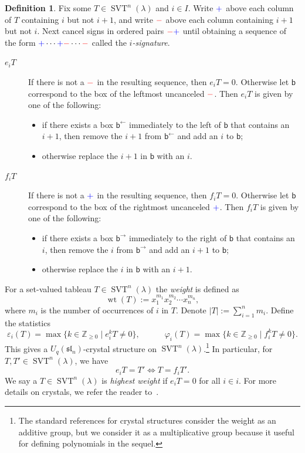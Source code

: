 \documentclass[10pt]{amsart}
\theoremstyle{definition}
\newtheorem{defi}[theo]{Definition}
\newcommand{\bbb}{\mathsf{b}}
\newcommand{\abs}[1]{\lvert #1 \rvert}
\newcommand{\fsl}{\mathfrak{sl}}
\DeclareMathOperator{\wt}{wt} %
\DeclareMathOperator{\svt}{SVT} %
\newcommand{\ZZ}{\mathbb{Z}}
\newcommand{\bplus}{{\color{blue}+}}
\newcommand{\bminus}{{\color{red}-}}
\newcommand{\defn}[1]{{\color{darkred}\emph{#1}}} %
\begin{document}
\begin{defi}
\label{defn:svt_crystal_ops}
Fix some $T \in \svt^n(\lambda)$ and $i \in I$.
Write $\bplus$ above each column of $T$ containing $i$ but not $i+1$, and write $\bminus$ above each column containing $i+1$ but not $i$. Next cancel signs in ordered pairs $\bminus \bplus$ until obtaining a sequence of the form $\bplus \cdots \bplus \bminus \cdots \bminus$ called the \defn{$i$-signature}.
\begin{description}
\item[\defn{$e_i T$}] If there is not a $\bminus$ in the resulting sequence, then $e_i T = 0$. Otherwise let $\bbb$ correspond to the box of the leftmost uncanceled $\bminus$. Then $e_i T$ is given by one of the following:
\begin{itemize}
\item if there exists a box $\bbb^{\leftarrow}$ immediately to the left of $\bbb$ that contains an $i+1$, then remove the $i+1$ from $\bbb^{\leftarrow}$ and add an $i$ to $\bbb$;
\item otherwise replace the $i+1$ in $\bbb$ with an $i$.
\end{itemize}

\item[\defn{$f_i T$}] If there is not a $\bplus$ in the resulting sequence, then $f_i T = 0$. Otherwise let $\bbb$ correspond to the box of the rightmost uncanceled $\bplus$. Then $f_i T$ is given by one of the following:
\begin{itemize}
\item if there exists a box $\bbb^{\rightarrow}$ immediately to the right of $\bbb$ that contains an $i$, then remove the $i$ from $\bbb^{\rightarrow}$ and add an $i+1$ to $\bbb$;
\item otherwise replace the $i$ in $\bbb$ with an $i+1$.
\end{itemize}
\end{description}
\end{defi}

For a set-valued tableau $T \in \svt^n(\lambda)$ the \defn{weight} is defined as
\begin{equation}
\label{eq:weight_defn}
\wt(T) := x_1^{m_1} x_2^{m_2} \cdots x_n^{m_n},
\end{equation}
where $m_i$ is the number of occurrences of $i$ in $T$.
Denote $\abs{T} := \sum_{i=1}^n m_i$.
Define the statistics
\[
\varepsilon_i(T) = \max \{k \in \ZZ_{\geq 0} \mid e_i^k T \neq 0\},
\qquad\quad
\varphi_i(T) = \max \{k \in \ZZ_{\geq 0} \mid f_i^k T \neq 0\}.
\]
This gives a $U_q(\fsl_n)$-crystal structure on $\svt^n(\lambda)$.\footnote{The standard references for crystal structures consider the weight as an additive group, but we consider it as a multiplicative group because it useful for defining polynomials in the sequel.}
In particular, for $T, T' \in \svt^n(\lambda)$, we have
\[
e_i T = T' \Longleftrightarrow T = f_i T'.
\]
We say a $T \in \svt^n(\lambda)$ is \defn{highest weight} if $e_i T = 0$ for all $i \in i$.
For more details on crystals, we refer the reader to~\cite{BS17,K91}.
\end{document}
